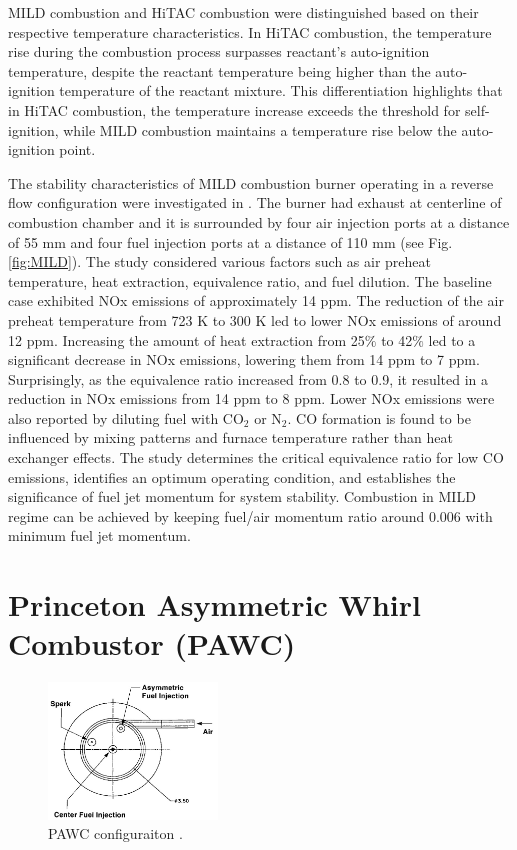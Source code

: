 MILD combustion and HiTAC combustion were distinguished based on their respective temperature characteristics. In HiTAC combustion, the temperature rise during the combustion process surpasses reactant's auto-ignition temperature, despite the reactant temperature being higher than the auto-ignition temperature of the reactant mixture\cite{VAThesis2011}. This differentiation highlights that in HiTAC combustion, the temperature increase exceeds the threshold for self-ignition, while MILD combustion maintains a temperature rise below the auto-ignition point.

The stability characteristics of MILD combustion burner operating in a reverse flow configuration were investigated in \cite{SZEGO2009429}. The burner had exhaust at centerline of combustion chamber and it is surrounded by four air injection ports at a distance of 55 mm and four fuel injection ports at a distance of 110 mm (see Fig. \ref{fig:MILD}). The study considered various factors such as air preheat temperature, heat extraction, equivalence ratio, and fuel dilution. The baseline case exhibited NOx emissions of approximately 14 ppm. The reduction of the air preheat temperature from 723 K to 300 K led to lower NOx emissions of around 12 ppm. Increasing the amount of heat extraction from 25$\%$ to 42$\%$ led to a significant decrease in NOx emissions, lowering them from 14 ppm to 7 ppm. Surprisingly, as the equivalence ratio increased from 0.8 to 0.9, it resulted in a reduction in NOx emissions from 14 ppm to 8 ppm. Lower NOx emissions were also reported by diluting fuel with CO$_2$ or N$_2$. CO formation is found to be influenced by mixing patterns and furnace temperature rather than heat exchanger effects. The study determines the critical equivalence ratio for low CO emissions, identifies an optimum operating condition, and establishes the significance of fuel jet momentum for system stability\cite{MARDANI2024100905}. Combustion in MILD regime can be achieved by keeping fuel/air momentum ratio around 0.006 with minimum fuel jet momentum.

\section{Princeton Asymmetric Whirl Combustor (PAWC)}
\begin{figure}
    \centering
    \includegraphics[width=0.4\textwidth]{Chapter2/Images/PAWC.jpeg}
  \caption[PAWC configuraiton]{PAWC configuraiton \cite{YETTER20001265}.}
  \label{fig:PAWC}
\end{figure}

